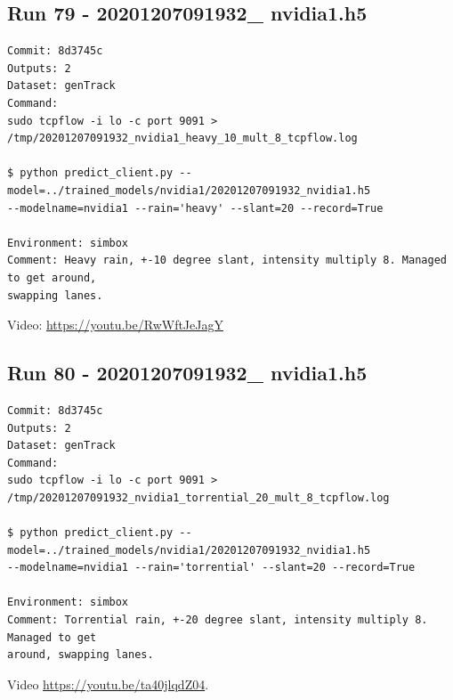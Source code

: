 \subsection{Run 79 - 20201207091932\_ nvidia1.h5 }
\label{app_res:79}
\begin{verbatim}
Commit: 8d3745c 
Outputs: 2
Dataset: genTrack
Command:
sudo tcpflow -i lo -c port 9091 > /tmp/20201207091932_nvidia1_heavy_10_mult_8_tcpflow.log

$ python predict_client.py --model=../trained_models/nvidia1/20201207091932_nvidia1.h5
--modelname=nvidia1 --rain='heavy' --slant=20 --record=True

Environment: simbox
Comment: Heavy rain, +-10 degree slant, intensity multiply 8. Managed to get around,
swapping lanes.
\end{verbatim}
Video: \url{https://youtu.be/RwWftJeJagY}

\subsection{Run 80 - 20201207091932\_ nvidia1.h5 }
\label{app_res:80}
\begin{verbatim}
Commit: 8d3745c 
Outputs: 2
Dataset: genTrack
Command:
sudo tcpflow -i lo -c port 9091 >
/tmp/20201207091932_nvidia1_torrential_20_mult_8_tcpflow.log

$ python predict_client.py --model=../trained_models/nvidia1/20201207091932_nvidia1.h5
--modelname=nvidia1 --rain='torrential' --slant=20 --record=True

Environment: simbox
Comment: Torrential rain, +-20 degree slant, intensity multiply 8. Managed to get 
around, swapping lanes.
\end{verbatim}
Video \url{https://youtu.be/ta40jlqdZ04}. 


